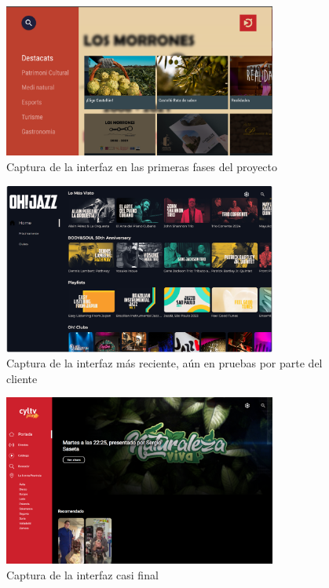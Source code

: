 \begin{figure}[H]
    \centering
    \includegraphics[width=0.8\textwidth]{imaxes/UX_inicios.png}
    \caption{Captura de la interfaz en las primeras fases del proyecto}
    \label{fig:UX_inicios}
\end{figure}
\begin{figure}[H]
    \centering
    \includegraphics[width=0.8\textwidth]{imaxes/Home_desp_OhJazz.png}
    \caption{Captura de la interfaz más reciente, aún en pruebas por parte del cliente}
    \label{fig:Home_desp_OhJazz}
\end{figure}
\begin{figure}[H]
    \centering
    \includegraphics[width=0.8\textwidth]{imaxes/Home_CyLTv.png}
    \caption{Captura de la interfaz casi final}
    \label{fig:Home_CyLTv}
\end{figure}

